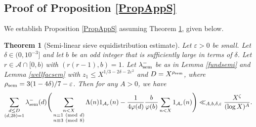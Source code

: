 \documentclass[12pt]{amsart}
\numberwithin{equation}{section}
\newtheorem{thm}{Theorem}
\theoremstyle{remark}
\theoremstyle{definition}
\newcommand{\imod}[1]{\ (\mathrm{mod}\ #1)}
\begin{document}
\subsection{Proof of Proposition \ref{PropAppS}}

We establish Proposition \ref{PropAppS} assuming Theorem \ref{Hyp1}, given below.


\begin{thm}[Semi-linear sieve equidistribution estimate]\label{Hyp1}
Let $\varepsilon>0$ be small. Let $\delta \in (0, 10^{-3}]$ and let $b$ be an odd integer that is sufficiently large in terms of $\delta$. Let $r\in \mathcal{A}\cap[0, b)$ with $(r(r-1), b)=1$. Let $\lambda^-_{\textup{sem}}$ be as in Lemma \ref{fundsemi} and Lemma \ref{wellfacsem} with $z_1\leq X^{1/3-2\delta-2\varepsilon^2}$ and $D=X^{\rho_{\textup{sem}}}$, where $\rho_{\textup{sem}}=3(1-4\delta)/7-\varepsilon$. Then for any $A>0$, we have
\begin{align}\notag 
\sum_{\substack{d\leq D\\(d,2b)=1}}\lambda^-_{\textup{sem}}(d)\Bigg(\sum_{\substack{n < X\\n\equiv 1 \imod d\\n\equiv 3\imod 8}}\Lambda(n)1_{\mathcal{A}_r}(n) - \dfrac{1}{4\varphi(d)}\dfrac{b}{\varphi(b)}\sum_{\substack{n<X}}1_{\mathcal{A}_r}(n)\Bigg) \ll_{A, b, \delta, \varepsilon} \dfrac{X^{\zeta}}{(\log X)^A}.
\end{align}
\end{thm}
\end{document}
